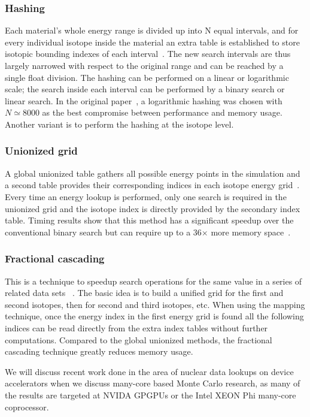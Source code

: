 \subsubsection*{\textbf{Hashing}} Each material's whole energy range is divided up into N equal intervals, and for every individual isotope inside the material an extra table is established to store isotopic bounding indexes of each interval~\cite{brown2014new}. The new search intervals are thus largely narrowed with respect to the original range and can be reached by a single float division. The hashing can be performed on a linear or logarithmic scale; the search inside each interval can be performed by a binary search or linear search. In the original paper~\cite{brown2014new}, a logarithmic hashing was chosen with $ N \simeq 8000 $ as the best compromise between performance and memory usage. Another variant is to perform the hashing at the isotope level.
%
\subsubsection*{\textbf{Unionized grid}} A global unionized table gathers all possible energy points in the simulation and a second table provides their corresponding indices in each isotope energy grid~\cite{leppanen2009two}. Every time an energy lookup is performed, only one search is required in the unionized grid and the isotope index is directly provided by the secondary index table. Timing results show that this method has a significant speedup over the conventional binary search but can require up to a 36$\times$ more memory space~\cite{a.l.lunda.r.siegel2015}.
%
\subsubsection*{\textbf{Fractional cascading}} This is a technique to speedup search operations for the same value in a series of related data sets ~\cite{a.l.lunda.r.siegel2015}. The basic idea is to build a unified grid for the first and second isotopes, then for second and third isotopes, etc. When using the mapping technique, once the energy index in the first energy grid is found all the following indices can be read directly from the extra index tables without further computations. Compared to the global unionized methods, the fractional cascading technique greatly reduces memory usage.
%

%
We will discuss recent work done in the area of nuclear data lookups on device accelerators when we discuss many-core based Monte Carlo research, as many of the results are targeted at NVIDA GPGPUs or the Intel XEON Phi many-core coprocessor. 
